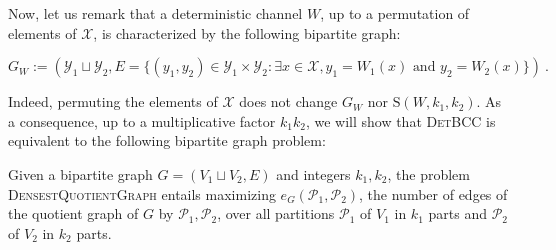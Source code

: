 Now, let us remark that a deterministic channel $W$, up to a permutation of elements of $\mathcal{X}$, is characterized by the following bipartite graph:

\begin{definition}
\[ G_W:=(\mathcal{Y}_1 \sqcup \mathcal{Y}_2, E = \{(y_1,y_2) \in \mathcal{Y}_1 \times \mathcal{Y}_2: \exists x \in \mathcal{X}, y_1=W_1(x) \text{ and } y_2=W_2(x)\}) \ . \]
\end{definition}

Indeed, permuting the elements of $\mathcal{X}$ does not change $G_W$ nor $\mathrm{S}(W,k_1,k_2)$. As a consequence, up to a multiplicative factor $k_1k_2$, we will show that \textsc{DetBCC} is equivalent to the following bipartite graph problem:

\begin{definition}
Given a bipartite graph $G  = (V_1 \sqcup V_2, E)$ and integers $k_1,k_2$, the problem \textsc{DensestQuotientGraph} entails maximizing $e_G(\mathcal{P}_1,\mathcal{P}_2)$, the number of edges of the quotient graph of $G$ by $\mathcal{P}_1,\mathcal{P}_2$, over all partitions $\mathcal{P}_1$ of $V_1$ in $k_1$ parts and $\mathcal{P}_2$ of $V_2$ in $k_2$ parts.
\end{definition}

